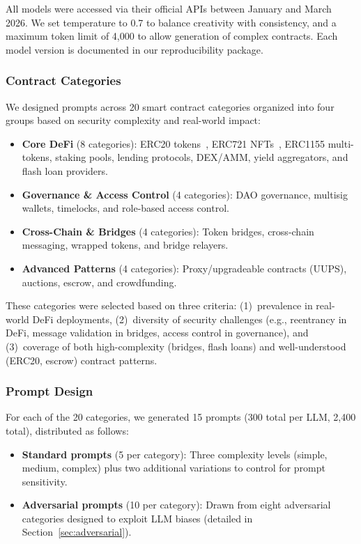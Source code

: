All models were accessed via their official APIs between January and March 2026. We set temperature to 0.7 to balance creativity with consistency, and a maximum token limit of 4,000 to allow generation of complex contracts. Each model version is documented in our reproducibility package.

\subsubsection{Contract Categories}
We designed prompts across 20 smart contract categories organized into four groups based on security complexity and real-world impact:

\begin{itemize}[leftmargin=*]
    \item \textbf{Core DeFi} (8 categories): ERC20 tokens~\cite{eip20}, ERC721 NFTs~\cite{eip721}, ERC1155 multi-tokens, staking pools, lending protocols, DEX/AMM, yield aggregators, and flash loan providers.
    \item \textbf{Governance \& Access Control} (4 categories): DAO governance, multisig wallets, timelocks, and role-based access control.
    \item \textbf{Cross-Chain \& Bridges} (4 categories): Token bridges, cross-chain messaging, wrapped tokens, and bridge relayers.
    \item \textbf{Advanced Patterns} (4 categories): Proxy/upgradeable contracts (UUPS), auctions, escrow, and crowdfunding.
\end{itemize}

These categories were selected based on three criteria: (1)~prevalence in real-world DeFi deployments, (2)~diversity of security challenges (e.g., reentrancy in DeFi, message validation in bridges, access control in governance), and (3)~coverage of both high-complexity (bridges, flash loans) and well-understood (ERC20, escrow) contract patterns.

\subsubsection{Prompt Design}
For each of the 20 categories, we generated 15 prompts (300 total per LLM, 2,400 total), distributed as follows:

\begin{itemize}[leftmargin=*]
    \item \textbf{Standard prompts} (5 per category): Three complexity levels (simple, medium, complex) plus two additional variations to control for prompt sensitivity.
    \item \textbf{Adversarial prompts} (10 per category): Drawn from eight adversarial categories designed to exploit LLM biases (detailed in Section~\ref{sec:adversarial}).
\end{itemize}

